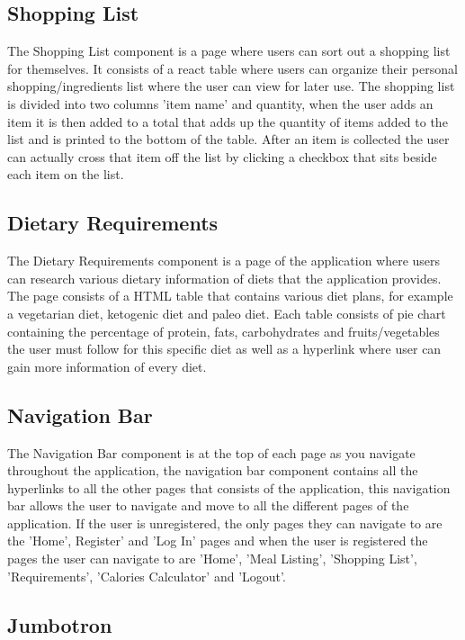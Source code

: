 \subsection{Shopping List}

The Shopping List component is a page where users can sort out a shopping list for themselves. It consists of a react table where users can organize their personal shopping/ingredients list where the user can view for later use. The shopping list is divided into two columns 'item name' and quantity, when the user adds an item it is then added to a total that adds up the quantity of items added to the list and is printed to the bottom of the table. After an item is collected the user can actually cross that item off the list by clicking a checkbox that sits beside each item on the list.

\subsection{Dietary Requirements}

The Dietary Requirements component is a page of the application where users can research various dietary information of diets that the application provides. The page consists of a HTML table that contains various diet plans, for example a vegetarian diet, ketogenic diet and paleo diet. Each table consists of pie chart containing the percentage of protein, fats, carbohydrates and fruits/vegetables the user must follow for this specific diet as well as a hyperlink where user can gain more information of every diet.

\subsection{Navigation Bar}

The Navigation Bar component is at the top of each page as you navigate throughout the application, the navigation bar component contains all the hyperlinks to all the other pages that consists of the application, this navigation bar allows the user to navigate and move to all the different pages of the application. If the user is unregistered, the only pages they can navigate to are the 'Home', Register' and 'Log In' pages and when the user is registered the pages the user can navigate to are 'Home', 'Meal Listing', 'Shopping List', 'Requirements', 'Calories Calculator' and 'Logout'.

\subsection{Jumbotron}

